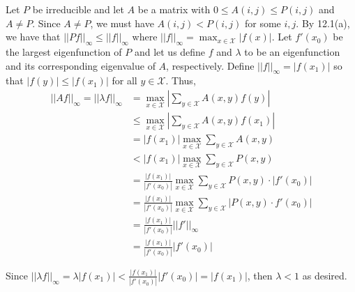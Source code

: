 \documentclass[12pt]{article}
\begin{document}
Let $P$ be irreducible and let $A$ be a matrix with $0 \leq A(i, j) \leq P(i, j)$ and $A \neq P$. Since $A \neq P$, we must have $A(i, j) < P(i,j)$ for some $i,j$. By 12.1(a), we have that $||Pf||_{\infty} \leq ||f||_{\infty}$ where $||f||_{\infty} = \max_{x \in \mathcal{X}} |f(x)|$. Let $f'(x_0)$ be the largest eigenfunction of $P$ and let us define $f$ and $\lambda$ to be an eigenfunction and its corresponding eigenvalue of $A$, respectively. Define $||f||_{\infty} = |f(x_1)|$ so that $|f(y)| \leq |f(x_1)|$ for all $y \in \mathcal{X}$. Thus,
\begin{align*}
||Af||_{\infty} = ||\lambda f||_{\infty} &= \max_{x \in \mathcal{X}} \left | \sum_{y \in \mathcal{X}} A(x,y) f(y) \right |\\
&\leq \max_{x \in \mathcal{X}} \left| \sum_{y \in \mathcal{X}} A(x, y) f(x_1) \right|\\
&= |f(x_1)| \max_{x \in \mathcal{X}} \sum_{y \in \mathcal{X}} A(x, y)\\
&< |f(x_1)| \max_{x \in \mathcal{X}} \sum_{y \in \mathcal{X}} P(x, y)\\
&= \frac{|f(x_1)|}{|f'(x_0)|} \max_{x \in \mathcal{X}} \sum_{y \in \mathcal{X}} P(x, y) \cdot |f'(x_0)|\\
&= \frac{|f(x_1)|}{|f'(x_0)|} \max_{x \in \mathcal{X}} \sum_{y \in \mathcal{X}} \left| P(x, y) \cdot f'(x_0) \right|\\
&= \frac{|f(x_1)|}{|f'(x_0)|} ||f'||_{\infty}\\
&= \frac{|f(x_1)|}{|f'(x_0)|} |f'(x_0)|
\end{align*}

Since $||\lambda f||_{\infty} = \lambda |f(x_1)| < \frac{|f(x_1)|}{|f'(x_0)|} |f'(x_0)| = |f(x_1)|$, then $\lambda < 1$ as desired.
\end{document}
